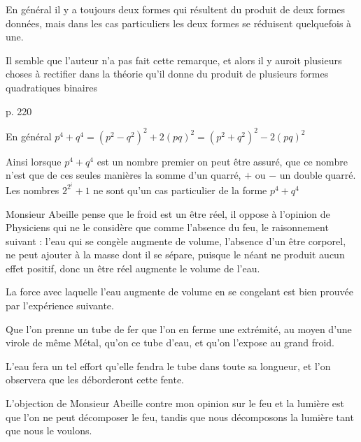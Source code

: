 \documentclass[11pt,a4paper]{article}
\begin{document}
En général il y a toujours deux formes qui résultent du produit de deux formes données, mais dans les cas particuliers les deux formes se réduisent quelquefois à une.

Il semble que l'auteur n'a pas fait cette remarque, et alors il y auroit plusieurs choses à rectifier dans la théorie qu'il donne du produit de plusieurs formes quadratiques binaires


p. 220

En général $p^4 + q^4 = (p^2 - q^2)^2 + 2(pq)^2 = (p^2 + q^2)^2 - 2(pq)^2$

Ainsi lorsque $p^4 + q^4$ est un nombre premier on peut être assuré, que ce nombre n'est que de ces seules manières la somme d'un quarré, \ill{} $+$ ou $-$ un double quarré. Les nombres $2^{2^i} + 1$ ne sont qu'un cas particulier de la forme $p^4 + q^4$


Monsieur Abeille pense que le froid est un être réel, il oppose à l'opinion de Physiciens qui ne le considère que comme l'absence du feu, le raisonnement suivant : l'eau qui se congèle augmente de volume, l'absence d'un être corporel, ne peut ajouter à la masse dont il se sépare, puisque le néant ne produit aucun effet positif, donc un être réel augmente le volume de l'eau.

La force avec laquelle l'eau augmente de volume en se congelant est bien prouvée par l'expérience suivante.

Que l'on prenne un tube de fer que l'on en ferme une extrémité, au moyen d'une virole de même Métal, qu'on  ce tube d'eau, et qu'on l'expose au grand froid.

L'eau fera un tel effort qu'elle fendra le tube dans toute sa longueur, et l'on observera que les  déborderont cette fente.


L'objection de Monsieur Abeille contre mon opinion sur le feu et la lumière est que l'on ne peut décomposer le feu, tandis que nous décomposons la lumière tant que nous le voulons.
\end{document}
